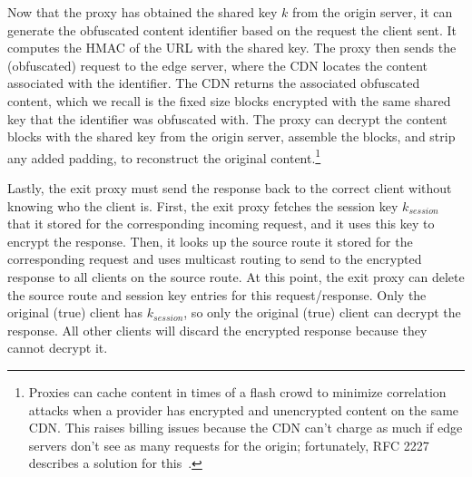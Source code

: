 Now that the proxy has obtained the shared key $k$ from the origin server, it can generate the obfuscated content identifier based 
on the request the client sent.  It computes the HMAC of the URL with the shared key.  The proxy then 
sends the (obfuscated) request to the edge server, where the CDN locates the content associated with the identifier.  The CDN returns 
the associated obfuscated content, which we recall is the fixed size blocks encrypted with the same shared key that the identifier was 
obfuscated with.  The proxy can decrypt the content blocks with the shared key from the origin server, assemble the blocks, and strip any 
added padding, to reconstruct the original content.\footnote{Proxies can cache content in times of a flash crowd to minimize correlation attacks when a provider has encrypted and unencrypted content on the same CDN.  This raises billing issues because the CDN can’t charge as much if edge servers don’t see as many requests for the origin; fortunately, RFC 2227 describes a solution for this~\cite{rfc2227}.}  

Lastly, the exit proxy must send the response back to the correct client without knowing who the client is.  First, the exit proxy fetches the session key $k_{session}$ 
that it stored for the corresponding incoming request, and it uses this key to encrypt the response.  Then, it looks up the source route it stored for the corresponding request 
and uses multicast routing to send to the encrypted response to all clients on the source route.  At this point, the exit proxy can delete the source route and session key entries 
for this request/response.  Only the original (true) client has $k_{session}$, so only the original (true) client can decrypt the response.  All other clients will discard 
the encrypted response because they cannot decrypt it.  

